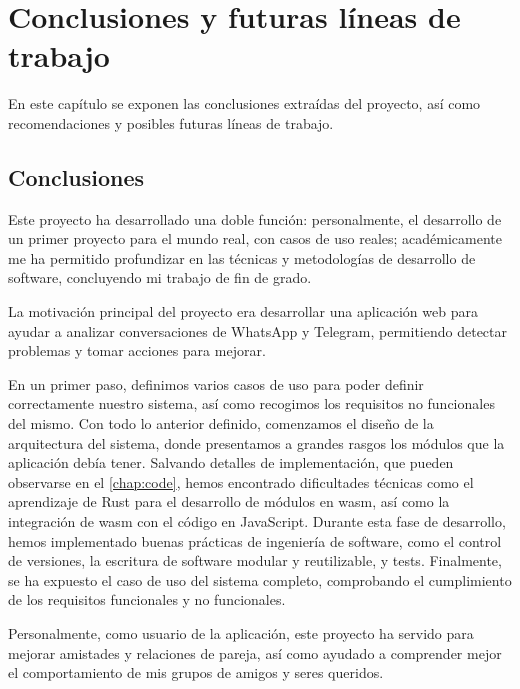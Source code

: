 \chapter{Conclusiones y futuras líneas de trabajo}
\label{chap:conclusions}

En este capítulo se exponen las conclusiones extraídas del proyecto, así como recomendaciones y posibles futuras líneas de trabajo.

\section{Conclusiones}
\label{sec:conclusions}

Este proyecto ha desarrollado una doble función: personalmente, el desarrollo de un primer proyecto para el mundo real, con casos de uso reales; académicamente me ha permitido profundizar en las técnicas y metodologías de desarrollo de software, concluyendo mi trabajo de fin de grado.

La motivación principal del proyecto era desarrollar una aplicación web para ayudar a analizar conversaciones de WhatsApp y Telegram, permitiendo detectar problemas y tomar acciones para mejorar.

En un primer paso, definimos varios casos de uso para poder definir correctamente nuestro sistema, así como recogimos los requisitos no funcionales del mismo. Con todo lo anterior definido, comenzamos el diseño de la arquitectura del sistema, donde presentamos a grandes rasgos los módulos que la aplicación debía tener. Salvando detalles de implementación, que pueden observarse en el \autoref{chap:code}, hemos encontrado dificultades técnicas como el aprendizaje de Rust para el desarrollo de módulos en \acrfull{wasm}, así como la integración de \acrshort{wasm} con el código en JavaScript. Durante esta fase de desarrollo, hemos implementado buenas prácticas de ingeniería de software, como el control de versiones, la escritura de software modular y reutilizable, y tests. Finalmente, se ha expuesto el caso de uso del sistema completo, comprobando el cumplimiento de los requisitos funcionales y no funcionales.

Personalmente, como usuario de la aplicación, este proyecto ha servido para mejorar amistades y relaciones de pareja, así como ayudado a comprender mejor el comportamiento de mis grupos de amigos y seres queridos.

